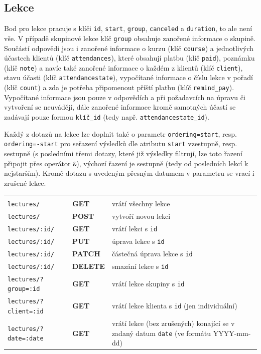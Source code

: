        \subsection{Lekce}
        Bod pro lekce pracuje s klíči \verb|id|, \verb|start|, \verb|group|, \verb|canceled| a \verb|duration|, to ale není vše. V případě skupinové lekce klíč \verb|group| obsahuje zanořené informace o skupině. Součástí odpovědi jsou i zanořené informace o kurzu (klíč \verb|course|) a jednotlivých účastech klientů (klíč \verb|attendances|), které obsahují platbu (klíč \verb|paid|), poznámku (klíč \verb|note|) a navíc také zanořené informace o každém z klientů (klíč \verb|client|), stavu účasti (klíč \verb|attendancestate|), vypočítané informace o číslu lekce v pořadí (klíč \verb|count|) a zda je potřeba připomenout příští platbu (klíč \verb|remind_pay|). Vypočítané informace jsou pouze v odpovědích a při požadavcích na úpravu či vytvoření se neuvádějí, dále zanořené informace kromě samotných účastí se zadávají pouze formou \verb|klíč_id| (tedy např. \verb|attendancestate_id|).
        
        Každý z dotazů na lekce lze doplnit také o parametr \verb|ordering=start|, resp. \verb|ordering=-start| pro seřazení výsledků dle atributu \verb|start| vzestupně, resp. sestupně (s posledními třemi dotazy, které již výsledky filtrují, lze toto řazení připojit přes operátor \verb|&|), výchozí řazení je sestupně (tedy od posledních lekcí k nejstarším). Kromě dotazu s uvedeným přesným datumem v parametru se vrací i zrušené lekce.
        
            {\centering
            \begin{tabular}{p{\apiA\textwidth} p{\apiB\textwidth} p{\apiC\textwidth}}&&\\
                \verb|lectures/|            & \textbf{GET}      & vrátí všechny lekce\\
                \verb|lectures/|            & \textbf{POST}     & vytvoří novou lekci\\
                \verb|lectures/:id/|        & \textbf{GET}      & vrátí lekci s \verb|id|\\
                \verb|lectures/:id/|        & \textbf{PUT}      & úprava lekce s \verb|id|\\
                \verb|lectures/:id/|        & \textbf{PATCH}    & částečná úprava lekce s \verb|id|\\
                \verb|lectures/:id/|        & \textbf{DELETE}   & smazání lekce s \verb|id|\\
                \verb|lectures/?group=:id|  & \textbf{GET}      & vrátí lekce skupiny s \verb|id|\\
                \verb|lectures/?client=:id| & \textbf{GET}      & vrátí lekce klienta s \verb|id| (jen individuální)\\
                \verb|lectures/?date=:date| & \textbf{GET}      & vrátí lekce (bez zrušených) konající se v zadaný datum \verb|date| (ve formátu YYYY-mm-dd)\\ %
            \end{tabular}}
        
